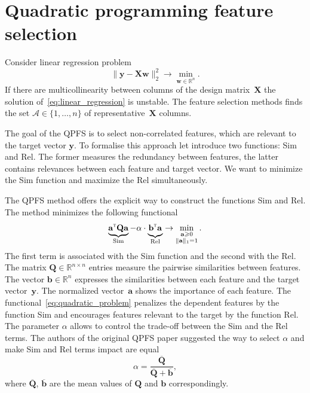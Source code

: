 \documentclass[a4paper,12pt]{article}
\renewcommand{\geq}{\ensuremath{\geqslant}}
\theoremstyle{plain} %
\theoremstyle{definition} %
\theoremstyle{remark} %
\newcommand{\ba}{\mathbf{a}}
\newcommand{\bb}{\mathbf{b}}
\newcommand{\bw}{\mathbf{w}}
\newcommand{\by}{\mathbf{y}}
\newcommand{\cA}{\mathcal{A}}
\newcommand{\bQ}{\mathbf{Q}}
\newcommand{\bbR}{\mathbb{R}}
\newcommand{\bX}{\mathbf{X}}
\newcommand{\T}{{\text{\tiny\sffamily\upshape\mdseries T}}}
\begin{document}
	\section*{Quadratic programming feature selection}
	Consider linear regression problem
	\begin{equation}
		 \| \by - \bX \bw\|_2^2 \rightarrow\min_{\bw \in \bbR^{n}}.
		 \label{eq:linear_regression}
	\end{equation}
	If there are multicollinearity between columns of the design matrix~$\bX$ the solution of~\eqref{eq:linear_regression} is unstable. The feature selection methods finds the set $\cA \in \{1, \dots, n\}$ of representative~$\bX$ columns. 
	
	The goal of the QPFS is to select non-correlated features, which are relevant to the target vector $\by$.
	To formalise this approach let introduce two functions: Sim and Rel. 
	The former measures the redundancy between features, the latter contains relevances between each feature and target vector. 
	We want to minimize the Sim function and maximize the Rel simultaneously.
	
	The QPFS method offers the explicit way to construct the functions Sim and Rel. 
	The method minimizes the following functional
	\begin{equation}
		\underbrace{\ba^{\T} \bQ \ba}_{\text{Sim}} - \alpha \cdot \underbrace{\vphantom{()} \mathbf{b}^{\T} \ba}_{\text{Rel}} \rightarrow \min_{\substack{\ba \geq 0 \\ \|\ba\|_1=1}}.
		\label{eq:quadratic_problem}
	\end{equation}
	The first term is associated with the Sim function and the second with the Rel. 
  	The matrix $\bQ \in \bbR^{n \times n}$ entries measure the pairwise similarities between features. 
  	The vector $\mathbf{b} \in \bbR^n$ expresses the similarities between each feature and the target vector~$\by$.
  	The normalized vector~$\ba$ shows the importance of each feature. 
  	The functional~\eqref{eq:quadratic_problem} penalizes the dependent features by the function Sim and encourages features relevant to the target by the function Rel. 
  	The parameter $\alpha$ allows to control the trade-off between the Sim and the Rel terms.
  	The authors of the original QPFS paper suggested the way to select $\alpha$ and make Sim and Rel terms impact are equal
  	\[
  		\alpha = \frac{\overline{\bQ}}{\overline{\bQ} + \overline{\bb}},
  	\] 
  	where $\overline{\bQ}$, $\overline{\bb}$ are the mean values of $\bQ$ and $\bb$ correspondingly.
  	
\end{document}
